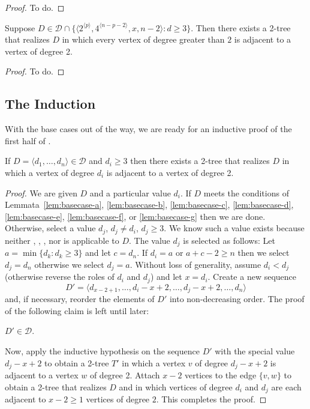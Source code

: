 \documentclass[lotsofwhite,charterfonts]{patmorin}
\newcommand{\rep}[1]{^{\langle#1\rangle}}
\begin{document}
\begin{proof}
To do.
\end{proof}

\begin{lem}
Suppose $D\in \mathcal{D}\cap \{\langle 2\rep{p},4\rep{n-p-2},x,n-2\rangle:
\mbox{$d\ge 3$}\}$.
Then there exists a 2-tree that realizes $D$ in which every vertex of
degree greater than $2$ is adjacent to a vertex of degree 2.
\end{lem}

\begin{proof}
To do.
\end{proof}

\subsection{The Induction}

With the base cases out of the way, we are ready for an inductive
proof of the first half of .

\begin{lem}
If $D=\langle d_1,\ldots,d_n\rangle \in \mathcal{D}$ and $d_i\ge 3$
then there exists a 2-tree that realizes $D$ in which a vertex of
degree $d_i$ is adjacent to a vertex of degree 2.  
\end{lem}

\begin{proof}

We are given $D$ and a particular value $d_i$. If $D$ meets the
conditions of Lemmata~\ref{lem:basecase-a}, \ref{lem:basecase-b},
\ref{lem:basecase-c}, \ref{lem:basecase-d}, \ref{lem:basecase-e},
\ref{lem:basecase-f}, or \ref{lem:basecase-g} then we are done.
Otherwise, select a value $d_j$, $d_j\neq d_i$, $d_j\ge 3$.  We know
such a value exists because neither ,
, , nor  is
applicable to $D$.  The value $d_j$ is selected as follows:  Let
$a=\min\{d_k : d_k\ge 3\}$ and let $c=d_n$.  If
$d_i=a$ or $a+c-2 \ge n$ then we select $d_j=d_n$ otherwise we select
$d_j=a$.  Without loss of generality, assume $d_i < d_j$ (otherwise
reverse the roles of $d_i$ and $d_j$) and let $x=d_i$.  Create a new
sequence 
\[  
   D'=\langle d_{x-2+1},\ldots,d_{i}-x+2,\ldots,d_{j}-x+2,\ldots,d_n \rangle
\] 
and, if necessary, reorder the elements of $D'$ into non-decreasing
order.  The proof of the following claim is left until later:

\begin{clm}
$D'\in \mathcal{D}$.
\end{clm}

Now, apply the inductive hypothesis on the sequence $D'$ with the
special value $d_j-x+2$ to obtain a 2-tree $T'$ in which a vertex $v$
of degree $d_j-x+2$ is adjacent to a vertex $w$ of degree 2.  Attach
$x-2$ vertices to the edge $\{v,w\}$ to obtain a 2-tree that realizes
$D$ and in which vertices of degree $d_i$ and $d_j$ are each adjacent
to $x-2\ge 1$ vertices of degree $2$.  This completes the proof.
\end{proof}
\end{document}
